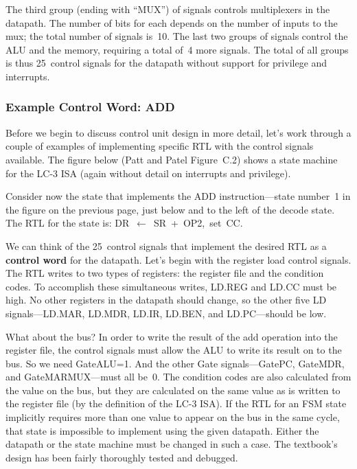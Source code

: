 The third group (ending with ``MUX'') of signals
controls multiplexers in the datapath.
The number of bits for each depends on the number of inputs to the mux;
the total number of signals is~10.
The last two groups of signals control the ALU and the memory, 
requiring a total of~4 more signals.  The total of all groups is thus
25~control signals for the datapath without support for privilege
and interrupts.\\

\subsubsection{Example Control Word: ADD}

Before we begin to discuss control unit design in more detail, let's
work through a couple of examples of implementing specific RTL with
the control signals available.  The figure below (Patt and Patel 
Figure~C.2) shows a state machine for the \mbox{LC-3} ISA (again 
without detail on interrupts and privilege).\\

\centerline{}

Consider now the state that implements the ADD instruction---state
number~1 in the figure on the previous page, just below and to the 
left of the decode state.
%
The RTL for the state is: DR~$\leftarrow$~SR~+~OP2,~set~CC.

We can think of the 25~control signals that implement the desired RTL
as a {\bf control word} for the datapath. 
%
Let's begin with the register load control signals.  The RTL writes
to two types of registers: the register file and the condition codes.
To accomplish these simultaneous writes, LD.REG and LD.CC must be high.
No other registers in the datapath should change, so the other five
LD signals---LD.MAR, LD.MDR, LD.IR, LD.BEN, and LD.PC---should be low.

What about the bus?  In order to write the result of the add operation
into the register file, the control signals must allow the ALU to write
its result on to the bus.  So we need GateALU=1.  And the other Gate
signals---GatePC, GateMDR, and GateMARMUX---must all be~0.  The 
condition codes are also calculated from the value on the bus, but
they are calculated on the same value as is written to the register
file (by the definition of the \mbox{LC-3} ISA).
%
If the RTL for an FSM state implicitly requires more than one value 
to appear on the bus in the same cycle, that state is impossible to 
implement using the given datapath.  Either the datapath or the state 
machine must be changed in such a case.  The textbook's design has been 
fairly thoroughly tested and debugged.

